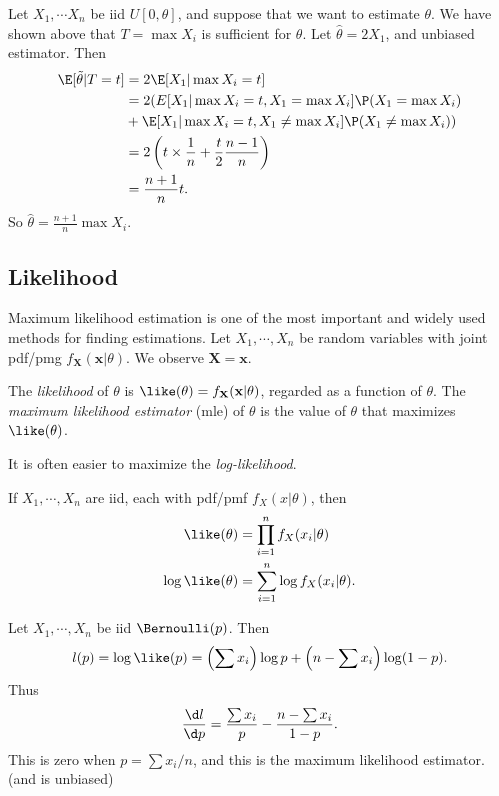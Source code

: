 \documentclass[a4paper]{article}
\begin{document}
\begin{eg}
  Let $X_1, \cdots X_n$ be iid $U[0, \theta]$, and suppose that we want to estimate $\theta$. We have shown above that $T = \max X_i$ is sufficient for $\theta$. Let $\hat{\theta} = 2X_1$, and unbiased estimator. Then
  \begin{align*}
    \E[\tilde{\theta}|T = t] &= 2\E[X_1|\max X_i = t]\\
    &= 2(E[X_1|\max X_i = t, X_1 = \max X_i]\P(X_1 = \max X_i)\\
    &+ \E[X_1|\max X_i = t, X_1 \not= \max X_i] \P(X_1 \not= \max X_i))\\
    &= 2\left(t\times \frac{1}{n} + \frac{t}{2}\frac{n - 1}{n}\right)\\
    &= \frac{n + 1}{n}t.
  \end{align*}
  So $\hat{\theta} = \frac{n + 1}{n}\max X_i$.
\end{eg}

\subsection{Likelihood}
Maximum likelihood estimation is one of the most important and widely used methods for finding estimations. Let $X_1, \cdots , X_n$ be random variables with joint pdf/pmg $f_\mathbf{X}(\mathbf{x}|\theta)$. We observe $\mathbf{X} = \mathbf{x}$.

\begin{defi}[Likelihood]
  The \emph{likelihood} of $\theta$ is $\like(\theta) = f_\mathbf{X}(\mathbf{x} | \theta)$, regarded as a function of $\theta$. The \emph{maximum likelihood estimator} (mle) of $\theta$ is the value of $\theta$ that maximizes $\like (\theta)$.
\end{defi}
It is often easier to maximize the \emph{log-likelihood}.

If $X_1, \cdots, X_n$ are iid, each with pdf/pmf $f_X(x|\theta)$, then
\begin{align*}
  \like(\theta) &= \prod_{i = 1}^n f_X(x_i|\theta)\\
  \log\like (\theta) &= \sum_{i = 1}^n \log f_X(x_i|\theta).
\end{align*}

\begin{eg}
  Let $X_1, \cdots, X_n$ be iid $\Bernoulli(p)$. Then
  \[
    l(p) =\log\like(p) = \left(\sum x_i\right)\log p + \left(n - \sum x_i\right)\log(1 - p).
  \]
  Thus
  \[
    \frac{\d l}{\d p} = \frac{\sum x_i}{p} - \frac{n - \sum x_i}{1 - p}.
  \]
  This is zero when $p = \sum x_i /n$, and this is the maximum likelihood estimator. (and is unbiased)
\end{eg}
\end{document}

